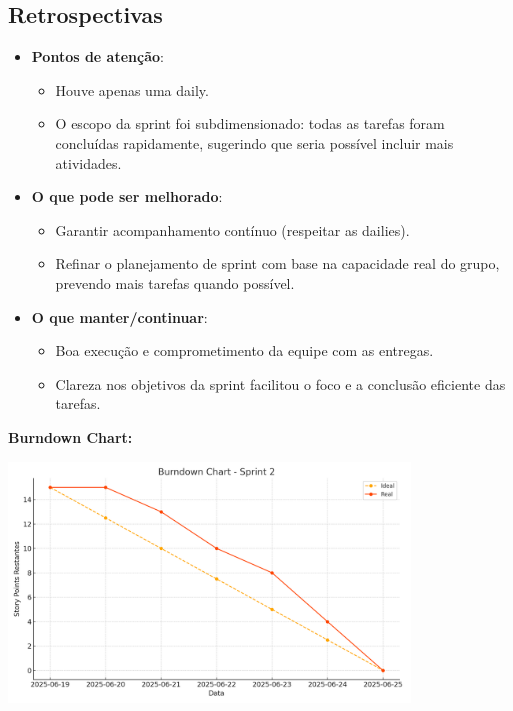 \subsection{Retrospectivas}

\begin{itemize}
  \item \textbf{Pontos de atenção}:
  \begin{itemize}
    \item Houve apenas uma daily.
    \item O escopo da sprint foi subdimensionado: todas as tarefas foram concluídas rapidamente, sugerindo que seria possível incluir mais atividades.
  \end{itemize}

  \item \textbf{O que pode ser melhorado}:
  \begin{itemize}
    \item Garantir acompanhamento contínuo (respeitar as dailies).
    \item Refinar o planejamento de sprint com base na capacidade real do grupo, prevendo mais tarefas quando possível.
  \end{itemize}

  \item \textbf{O que manter/continuar}:
  \begin{itemize}
    \item Boa execução e comprometimento da equipe com as entregas.
    \item Clareza nos objetivos da sprint facilitou o foco e a conclusão eficiente das tarefas.
  \end{itemize}
\end{itemize}

\vspace{1em}
\noindent\textbf{Burndown Chart:}

\begin{center}
  \includegraphics[width=0.8\textwidth]{pictures/burndown_sprint2.png}
\end{center}
